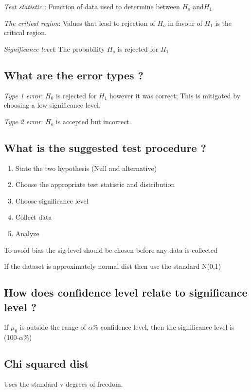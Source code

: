 \documentclass[11pt]{scrartcl} %
\begin{document}
\emph{Test statistic} : Function of data used to determine between
\(H_o\) and\(H_1\)

\emph{The critical region}: Values that lead to rejection of \(H_o\) in
favour of \(H_1\) is the critical region.

\emph{Significance level}: The probability \(H_o\) is rejected for
\(H_1\)

\subsection{What are the error types
?}

\emph{Type 1 error}: \(H_0\) is rejected for \(H_1\) however it was
correct; This is mitigated by choosing a low significance level.

\emph{Type 2 error}: \(H_o\) is accepted but incorrect.

\subsection{What is the suggested test procedure
?}

\begin{enumerate}
\item State the two hypothesis (Null and alternative)
\item Choose the appropriate test statistic and distribution
\item Choose significance level
\item Collect data
\item Analyze
\end{enumerate}

To avoid bias the sig level should be chosen before any data is
collected

If the dataset is approximately normal dist then use the standard N(0,1)

\subsection{How does confidence level relate to significance level
?}

If \(\mu_0\) is outside the range of \(\alpha\)\% confidence level, then
the significance level is (100-\(\alpha\)\%)

\subsection{Chi squared dist}

Uses the standard v degrees of freedom.
\end{document}
